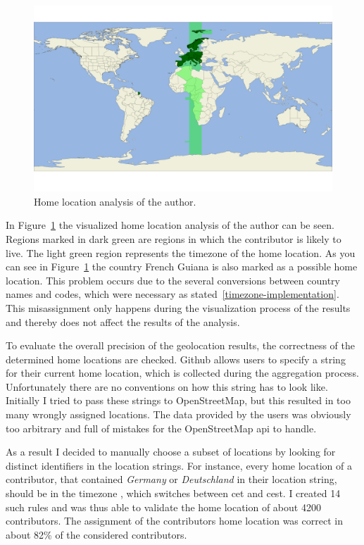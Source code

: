\begin{figure}[H]
    \includegraphics[scale=0.10]{./graphs/analysis/author-home-location}
    \centering
    \caption{Home location analysis of the author.}\label{fig:author-home-location}
\end{figure}

In Figure~\ref{fig:author-home-location} the visualized home location analysis of the author can be seen.
Regions marked in dark green are regions in which the contributor is likely to live.
The light green region represents the timezone of the home location.
As you can see in Figure~\ref{fig:author-home-location} the country French Guiana is also marked as a possible home location.
This problem occurs due to the several conversions between country names and codes, which were necessary as stated~\ref{timezone-implementation}.
This misassignment only happens during the visualization process of the results and thereby does not affect the results of the analysis.

To evaluate the overall precision of the geolocation results, the correctness of the determined home locations are checked.
Github allows users to specify a string for their current home location, which is collected during the aggregation process.
Unfortunately there are no conventions on how this string has to look like.
Initially I tried to pass these strings to OpenStreetMap, but this resulted in too many wrongly assigned locations.
The data provided by the users was obviously too arbitrary and full of mistakes for the OpenStreetMap \ac{api} to handle.

As a result I decided to manually choose a subset of locations by looking for distinct identifiers in the location strings.
For instance, every home location of a contributor, that contained \emph{Germany} or \emph{Deutschland} in their location string, should be in the  timezone , which switches between \ac{cet} and \ac{cest}.
I created 14 such rules and was thus able to validate the home location of about 4200 contributors.
The assignment of the contributors home location was correct in about 82\% of the considered contributors.

